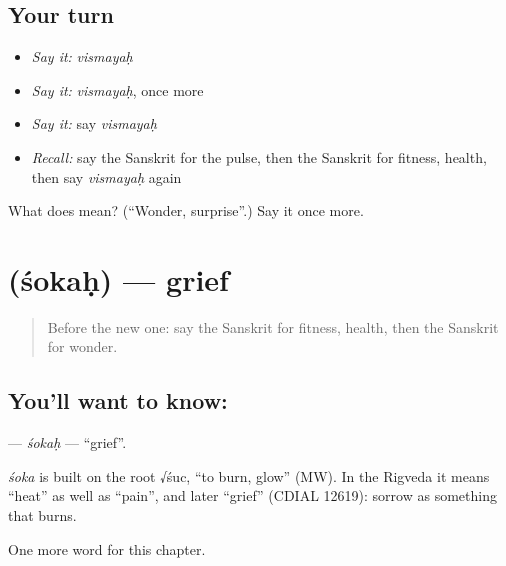 \subsection*{Your turn}
\begin{itemize}
\raggedright
  \item \emph{Say it:} \emph{vismayaḥ}
  \item \emph{Say it:} \emph{vismayaḥ}, once more
  \item \emph{Say it:} say \emph{vismayaḥ}
  \item \emph{Recall:} say the Sanskrit for the pulse, then the Sanskrit for fitness, health, then say \emph{vismayaḥ} again
\end{itemize}

\begin{tcolorbox}[breakable,colback=teal!4,colframe=teal!35!black,title={Before you move on}]
What does  mean? (\textquotedblleft{}Wonder, surprise\textquotedblright{}.) Say it once more.
\end{tcolorbox}
\section[\texorpdfstring{\sk{शोकः} (śokaḥ)}{शोकः (śokaḥ)}]{ (śokaḥ) — grief}

\label{lesson:SA-C182-sokah}



\begin{quote}
Before the new one: say the Sanskrit for fitness, health, then the Sanskrit for wonder.
\end{quote}

\subsection*{You'll want to know: }
\textbf{} — \emph{śokaḥ} — \textquotedblleft{}grief\textquotedblright{}.

\begin{cousinweb}
\emph{śoka} is built on the root √śuc, \textquotedblleft{}to burn, glow\textquotedblright{} (MW). In the Rigveda it means \textquotedblleft{}heat\textquotedblright{} as well as \textquotedblleft{}pain\textquotedblright{}, and later \textquotedblleft{}grief\textquotedblright{} (CDIAL 12619): sorrow as something that burns.
\end{cousinweb}

\begin{grammarlens}[title={What you've built}]
One more word for this chapter.
\end{grammarlens}

